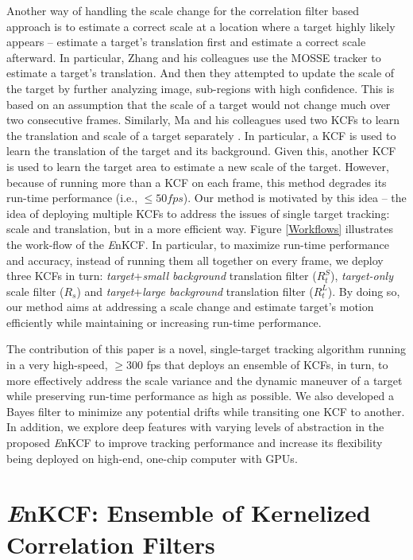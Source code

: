 \documentclass[10pt,twocolumn,letterpaper]{article}
\begin{document}
Another way of handling the scale change for the correlation filter
based approach is to estimate a correct scale at a location where a
target highly likely appears \cite{zhang2014fast} -- estimate a
target's translation first and estimate a correct scale afterward. In
particular, Zhang and his colleagues use the MOSSE tracker to estimate
a target's translation. And then they attempted to update the scale of
the target by further analyzing image, sub-regions with high
confidence. This is based on an assumption that the scale of a target
would not change much over two consecutive frames. Similarly, Ma and
his colleagues used two KCFs to learn the translation and scale of a
target separately \cite{ma2015long}. In particular, a KCF is used to
learn the translation of the target and its background. Given this,
another KCF is used to learn the target area to estimate a new scale
of the target. However, because of running more than a KCF on each
frame, this method degrades its run-time performance (i.e., $\leq 50
fps$). Our method is motivated by this idea -- the idea of deploying
multiple KCFs to address the issues of single target tracking: scale
and translation, but in a more efficient way. Figure \ref{Workflows}
illustrates the work-flow of the {\it E}nKCF. In particular, to
maximize run-time performance and accuracy, instead of running them
all together on every frame, we deploy three KCFs in turn:
\textit{target}+\textit{small background} translation filter
($R_{t}^{S}$), \textit{target-only} scale filter ($R_{s}$) and
\textit{target}+\textit{large background} translation filter
($R_{t}^{L}$). By doing so, our method aims at addressing a scale
change and estimate target's motion efficiently while maintaining or
increasing run-time performance.

The contribution of this paper is a novel, single-target tracking
algorithm running in a very high-speed, $\geq 300$ fps that deploys an
ensemble of KCFs, in turn, to more effectively address the scale
variance and the dynamic maneuver of a target while preserving
run-time performance as high as possible. We also developed a Bayes
filter to minimize any potential drifts while transiting one KCF to
another. In addition, we explore deep features with varying levels of
abstraction in the proposed {\it E}nKCF to improve tracking
performance and increase its flexibility being deployed on high-end,
one-chip computer with GPUs.

\section{{\it E}nKCF: Ensemble of Kernelized Correlation Filters}
\end{document}
